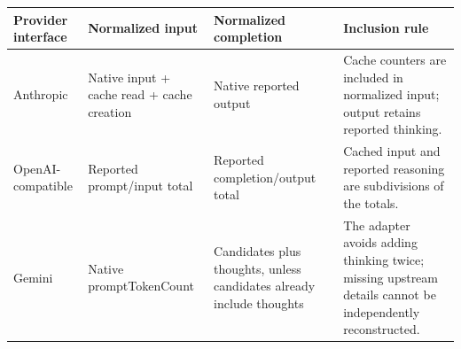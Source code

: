 \begin{tabular}{llll}
\hline
Provider interface & Normalized input & Normalized completion & Inclusion rule \\
\hline
Anthropic & Native input + cache read + cache creation & Native reported output & Cache counters are included in normalized input; output retains reported thinking. \\
OpenAI-compatible & Reported prompt/input total & Reported completion/output total & Cached input and reported reasoning are subdivisions of the totals. \\
Gemini & Native promptTokenCount & Candidates plus thoughts, unless candidates already include thoughts & The adapter avoids adding thinking twice; missing upstream details cannot be independently reconstructed. \\
\hline
\end{tabular}
